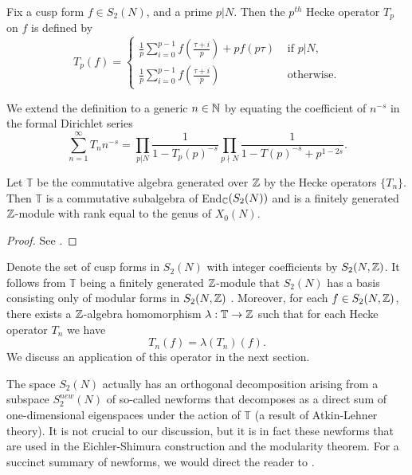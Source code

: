  \begin{definition}
 Fix a cusp form $f \in S_2(N)$, and a prime $p|N$. Then the $p^{th}$ Hecke operator $T_p$ on $f$ is defined by
 $$
T_p(f) = \left\{
	\begin{array}{ll}
		\frac{1}{p} \sum_{i=0}^{p-1}f\left(\frac{\tau + i}{p}\right) + pf(p\tau) & \mbox{ if } p|N,\\
		\frac{1}{p} \sum_{i=0}^{p-1}f\left(\frac{\tau + i}{p}\right) & \mbox{ otherwise}.
	\end{array}
\right.
$$
\end{definition}
We extend the definition to a generic $n \in \mathbb{N}$  by equating the coefficient of $n^{-s}$ in the formal Dirichlet series
$$\sum_{n=1}^\infty T_nn^{-s} = \prod_{p|N} \frac{1}{1 - T_p (p)^{-s}}\prod_{p \nmid N} \frac{1}{1-T(p)^{-s} + p ^{1-2s}}.$$
\begin{prop}
Let $\mathbb{T}$ be the commutative algebra generated over $\mathbb{Z}$ by the Hecke operators $\{T_n\}$. Then $\mathbb{T}$ is a commutative subalgebra of End$_{\mathbb{C}}(S_2(N))$ and is a finitely generated $\mathbb{Z}$-module with rank equal to the genus of $X_0(N)$.
\end{prop} 
\begin{proof}
See \cite[Page 15]{Darmon2}.
\end{proof}
 Denote the set of cusp forms in $S_2(N)$ with integer coefficients by $S_2(N,\mathbb{Z})$. It follows from $\mathbb{T}$ being a finitely generated $\mathbb{Z}$-module that $S_2(N)$ has a basis consisting only of modular forms in $S_2(N,\mathbb{Z})$ \cite[Page 16]{Darmon2}. 
Moreover, for each $f \in S_2(N,\mathbb{Z})$, there exists a $\mathbb{Z}$-algebra homomorphism $\lambda:\mathbb{T} \to \mathbb{Z}$ such that for each Hecke operator $T_n$ we have \cite[Page 162]{Stein}
$$T_n(f) = \lambda(T_n)(f).$$
We discuss an application of this operator in the next section.
\begin{rmk}
The space $S_2(N)$ actually has an orthogonal decomposition arising from a subspace $S_2^{new}(N)$ of so-called newforms that decomposes as a direct sum of one-dimensional eigenspaces under the action of $\mathbb{T}$ (a result of Atkin-Lehner theory). It is not crucial to our discussion, but it is in fact these newforms that are used in the Eichler-Shimura construction and the modularity theorem. For a succinct summary of newforms, we would direct the reader to \cite[Page 283]{Knapp}.
\end{rmk}
 
 
